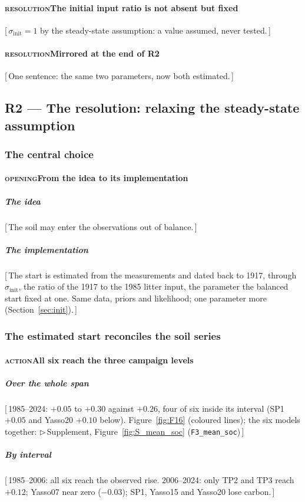 \documentclass[11pt]{article}
\newcounter{subsubparagraph}[subparagraph]
\newcommand{\beat}[1]{\textcolor{black!45}{\textsc{\small #1}}\enspace}
\newcommand{\gap}[1]{\textcolor{red!70!black}{\small[\,#1\,]}}
\newcommand{\suppanchor}[2]{\textcolor{red!70!black}{\small$\triangleright$\,Supplement,
  Figure~\ref{fig:#1} (\texttt{#2})}}
\newcommand{\sinit}{\sigma_{\mathrm{init}}}
\begin{document}
\paragraph{\beat{resolution}The initial input ratio is not absent but fixed}
\gap{$\sinit = 1$ by the steady-state assumption: a value assumed, never tested.}
\paragraph{\beat{resolution}Mirrored at the end of R2}
\gap{One sentence: the same two parameters, now both estimated.}

\subsection{R2 --- The resolution: relaxing the steady-state assumption}\label{sec:r2}

\subsubsection{The central choice}
\paragraph{\beat{opening}From the idea to its implementation}
\subparagraph{The idea}
\gap{The soil may enter the observations out of balance.}
\subparagraph{The implementation}
\gap{The start is estimated from the measurements and dated back to 1917, through $\sinit$, the
ratio of the 1917 to the 1985 litter input, the parameter the balanced start fixed at one. Same
data, priors and likelihood; one parameter more (Section~\ref{sec:init}).}

\subsubsection{The estimated start reconciles the soil series}
\paragraph{\beat{action}All six reach the three campaign levels}
\subparagraph{Over the whole span}
\gap{1985--2024: $+0.05$ to $+0.30$ against $+0.26$, four of six inside its interval (SP1 $+0.05$
and Yasso20 $+0.10$ below). Figure~\ref{fig:F16} (coloured lines); the six models together:
\suppanchor{S_mean_soc}{F3\_mean\_soc}}
\subparagraph{By interval}
\gap{1985--2006: all six reach the observed rise. 2006--2024: only TP2 and TP3 reach $+0.12$;
Yasso07 near zero ($-0.03$); SP1, Yasso15 and Yasso20 lose carbon.}
\end{document}
